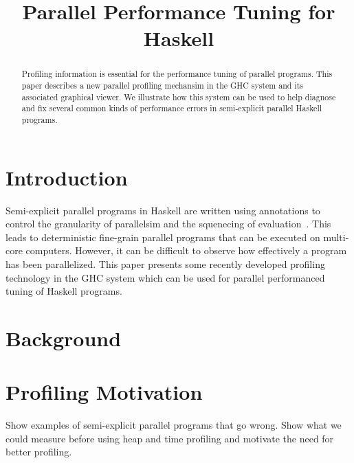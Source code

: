 \documentclass[twocolumn,9pt]{sigplanconf}
\title{Parallel Performance Tuning for Haskell}
\begin{document}
\maketitle

\begin{abstract}
Profiling information is essential for the performance tuning of parallel programs. This paper describes a new parallel profiling mechansim in the GHC system and its associated graphical viewer. We illustrate how this system can be used to help diagnose and fix several common kinds of performance errors in semi-explicit parallel Haskell programs.
\end{abstract}


\section{Introduction}
Semi-explicit parallel programs in Haskell are written using annotations to control the granularity of parallelsim and the squenecing of evaluation~\cite{spj:trin98b}. This leads to deterministic fine-grain parallel programs that can be executed on multi-core computers. However, it can be difficult to observe how effectively a program has been parallelized. This paper presents some recently developed profiling technology in the GHC system which can be used for parallel performanced tuning of Haskell programs.

\section{Background}

\section{Profiling Motivation}
Show examples of semi-explicit parallel programs that go wrong. Show what we could measure before using heap and time profiling and motivate the need for better profiling.
\end{document}
